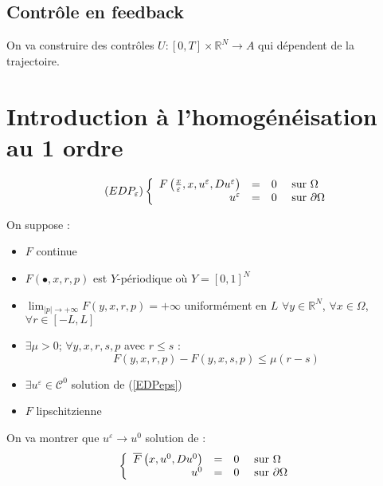 \subsection{Contrôle en feedback}
On va construire des contrôles $U:[0,T]\times\mathbb{R}^N\to A$ qui dépendent de la trajectoire.


\section{Introduction à l'homogénéisation au 1\ier{} ordre}
\begin{equation}\label{EDPeps} \tag{$EDP_\varepsilon$}
\left\{ \begin{array}{r c l l}
	F\left(\frac{x}{\varepsilon},x, u^\varepsilon, Du^\varepsilon\right)&=&0 &\text{ sur } \Omega\\
	u^\varepsilon &=& 0 &\text{ sur }\partial\Omega
\end{array}\right.
\end{equation}

On suppose : \begin{itemize}
\item $F$ continue
\item $F(\bullet, x, r, p)$ est $Y$-périodique où $Y=[0,1]^N$
\item $\lim_{|p|\to+\infty}F(y,x,r,p)=+\infty$ uniformément en $L$ $\forall y\in\mathbb{R}^N$, $\forall x\in\Omega$, $\forall r\in[-L,L]$
\item $\exists \mu>0$; $\forall y,x,r,s,p$ avec $r\leq s$ : \[F(y,x,r,p)-F(y,x,s,p)\leq \mu(r-s)\]
\item $\exists u^\varepsilon\in\mathscr{C}^0$ solution de (\ref{EDPeps})
\item $F$ lipschitzienne
\end{itemize}

On va montrer que $u^\varepsilon \to u^0$ solution de :
\[\left\{ \begin{array}{r c l l}
	\overline{F}\left(x, u^0, Du^0 \right)&=&0 &\text{ sur } \Omega\\
	u^0 &=& 0 &\text{ sur }\partial\Omega
\end{array}\right.\]

